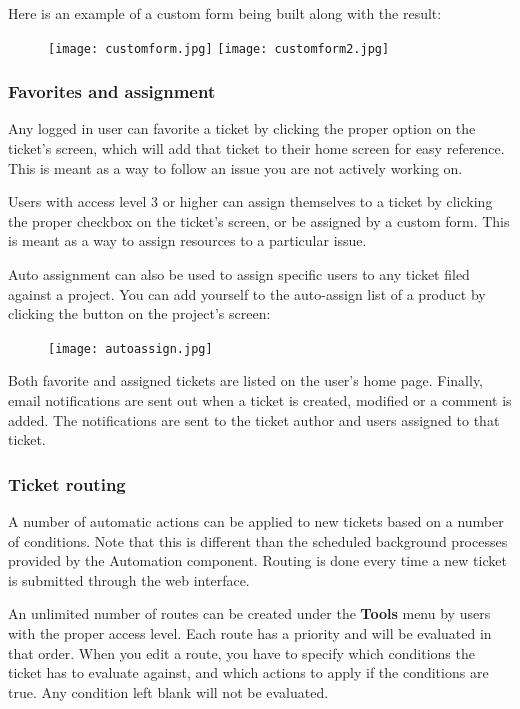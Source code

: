 \documentclass[11pt]{article}
\begin{document}
Here is an example of a custom form being built along with the result:

\begin{figure}[h]
\texttt{[image: customform.jpg]}
\texttt{[image: customform2.jpg]}
\end{figure}

\subsubsection{Favorites and assignment}
Any logged in user can favorite a ticket by clicking the proper option on the ticket's screen, which will add that ticket to their home screen for easy reference. This is meant as a way to follow an issue you are not actively working on.

Users with access level 3 or higher can assign themselves to a ticket by clicking the proper checkbox on the ticket's screen, or be assigned by a custom form. This is meant as a way to assign resources to a particular issue.

Auto assignment can also be used to assign specific users to any ticket filed against a project. You can add yourself to the auto-assign list of a product by clicking the button on the project's screen:

\begin{figure}[h]
\texttt{[image: autoassign.jpg]}
\end{figure}

Both favorite and assigned tickets are listed on the user's home page. Finally, email notifications are sent out when a ticket is created, modified or a comment is added. The notifications are sent to the ticket author and users assigned to that ticket.

\subsubsection{Ticket routing}
A number of automatic actions can be applied to new tickets based on a number of conditions. Note that this is different than the scheduled background processes provided by the Automation component. Routing is done every time a new ticket is submitted through the web interface.

An unlimited number of routes can be created under the \textbf{Tools} menu by users with the proper access level. Each route has a priority and will be evaluated in that order. When you edit a route, you have to specify which conditions the ticket has to evaluate against, and which actions to apply if the conditions are true. Any condition left blank will not be evaluated.
\end{document}
